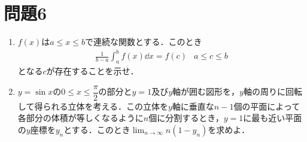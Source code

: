 \documentclass[unicode,12pt, A4j]{ltjsarticle}%
\begin{document}
\section{問題6}
\begin{enumerate}
 \item $f(x)$は$a\le x \le b$で連続な関数とする．このとき
\begin{align*}
 \frac{1}{b-a}\int_{a}^{b}f(x)\dd x=f(c) & a\le c \le b
\end{align*}
となる$c$が存在することを示せ．
 \item $y=\sin x$の$0\le x\le \dfrac{\pi}{2}$の部分と$y=1$及び$y$軸が囲む図形を，$y$軸の周りに回転して得られる立体を考える．この立体を$y$軸に垂直な$n-1$個の平面によって各部分の体積が等しくなるように$n$個に分割するとき，$y=1$に最も近い平面の$y$座標を$y_n$とする．このとき${\displaystyle \lim_{n\to\infty} n\left(1-y_n\right)}$を求めよ．
\end{enumerate}
\end{document}
